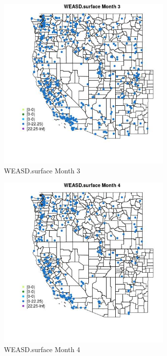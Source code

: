 \begin{figure} 
\centering  
\includegraphics[width=0.77\textwidth]{Code_Outputs/Report_ML_input_PM25_Step4_part_e_de_duplicated_aveswNAs_MapObsMo3WEASDsurface.jpg} 
\caption{\label{fig:Report_ML_input_PM25_Step4_part_e_de_duplicated_aveswNAsMapObsMo3WEASDsurface}WEASD.surface Month 3} 
\end{figure} 
 

\begin{figure} 
\centering  
\includegraphics[width=0.77\textwidth]{Code_Outputs/Report_ML_input_PM25_Step4_part_e_de_duplicated_aveswNAs_MapObsMo4WEASDsurface.jpg} 
\caption{\label{fig:Report_ML_input_PM25_Step4_part_e_de_duplicated_aveswNAsMapObsMo4WEASDsurface}WEASD.surface Month 4} 
\end{figure} 
 

